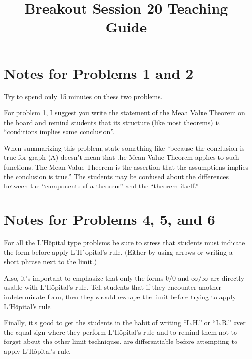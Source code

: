 \documentclass[handout,nooutcomes]{ximera}
\title{Breakout Session 20 Teaching Guide}
\begin{document}
\begin{abstract}

\end{abstract}
\maketitle

\section{Notes for Problems 1 and 2} 
Try to spend only 15 minutes on these two problems.

For problem 1, I suggest you write the statement of the Mean Value Theorem on the board and remind students that its structure (like most theorems) is ``conditions implies some conclusion''.

When summarizing this problem, state something like ``because the conclusion is true for graph (A) doesn't mean that the Mean Value Theorem applies to such functions. The Mean Value Theorem is the assertion that the assumptions implies the conclusion is true.''
The students may be confused about the differences between the ``components of a theorem'' and the ``theorem itself.''


\section{Notes for Problems 4, 5, and 6}
For all the L'H\^{o}pital type problems be sure to stress that students must indicate the form before apply L’Hˆopital’s rule. (Either by using arrows or writing a short phrase next to the limit.)

Also, it's important to emphasize that only the forms $0/0$ and $\infty/\infty$ are directly usable with L'H\^{o}pital's rule.
Tell students that if they encounter another indeterminate form, then they should reshape the limit before trying to apply L'H\^{o}pital’s rule.

Finally, it’s good to get the students in the habit of writing ``L.H.'' or ``L.R.'' over the equal sign where they perform L'H\^{o}pital's rule and to remind them not to forget about the other limit techniques.
are differentiable before attempting to apply L'H\^{o}pital's rule.
\end{document}
